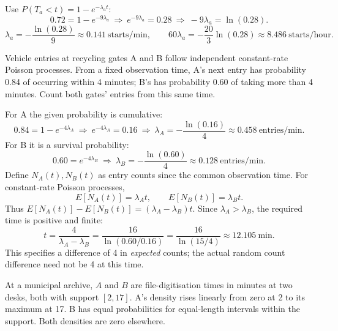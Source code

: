 Use $P(T_a<t)=1-e^{-\lambda_a t}$:
\[0.72=1-e^{-9\lambda_a}\ \Longrightarrow\ e^{-9\lambda_a}=0.28\ \Longrightarrow\ -9\lambda_a=\ln(0.28).\]
\[\lambda_a=-\frac{\ln(0.28)}9\approx0.141\ \text{starts/min},\qquad60\lambda_a=-\frac{20}3\ln(0.28)\approx\boxed{8.486\ \text{starts/hour}}.\]

Vehicle entries at recycling gates A and B follow independent constant-rate Poisson processes. From a fixed observation time, A's next entry has probability 0.84 of occurring within 4 minutes; B's has probability 0.60 of taking more than 4 minutes. Count both gates' entries from this same time.


For A the given probability is cumulative:
\[0.84=1-e^{-4\lambda_A}\ \Longrightarrow\ e^{-4\lambda_A}=0.16\ \Longrightarrow\ \lambda_A=-\frac{\ln(0.16)}4\approx0.458\ \text{entries/min}.\]
For B it is a survival probability:
\[0.60=e^{-4\lambda_B}\ \Longrightarrow\ \lambda_B=-\frac{\ln(0.60)}4\approx0.128\ \text{entries/min}.\]
Define $N_A(t),N_B(t)$ as entry counts since the common observation time. For constant-rate Poisson processes,
\[E[N_A(t)]=\lambda_A t,\qquad E[N_B(t)]=\lambda_B t.\]
Thus $E[N_A(t)]-E[N_B(t)]=(\lambda_A-\lambda_B)t$. Since $\lambda_A>\lambda_B$, the required time is positive and finite:
\[t=\frac4{\lambda_A-\lambda_B}=\frac{16}{\ln(0.60/0.16)}=\boxed{\frac{16}{\ln(15/4)}\approx12.105\ \text{min}}.\]
This specifies a difference of 4 in \emph{expected} counts; the actual random count difference need not be 4 at this time.

At a municipal archive, $A$ and $B$ are file-digitisation times in minutes at two desks, both with support $[2,17]$. A's density rises linearly from zero at 2 to its maximum at 17. B has equal probabilities for equal-length intervals within the support. Both densities are zero elsewhere.

